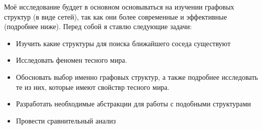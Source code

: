 \begin{justify}
    Моё исследование буддет в основном основываться на изучении
    графовых структур (в виде сетей), так как они более современные
    и эффективные (подробнее ниже). Перед собой я ставлю следующие 
    задачи:
    \begin{itemize}
        \item Изучить какие структуры для поиска ближайшего соседа существуют
        \item Исследовать феномен тесного мира.
        \item Обосновать выбор именно графовых структур, а также подробнее 
        исследовать те из них, которые имеют свойствр тесного мира.
        \item Разработать необходимые абстракции для работы с подобными
        структурами
        \item Провести сравнительный анализ
    \end{itemize}    
    
    
\end{justify}


